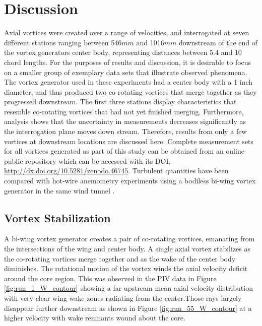 
\section{Discussion}

Axial vortices were created over a range of velocities, and interrogated at 
seven different stations ranging between 546$mm$ and 1016$mm$ downstream of the 
end of the vortex generators center body, representing distances between 5.4 
and 10 chord lengths. For the 
purposes of results and discussion, it is desirable to focus on a smaller group 
of exemplary data sets that illustrate observed phenomena. The vortex generator 
used in these experiments had a center body with a 1 inch diameter, and thus 
produced two co-rotating vortices that merge together as they progressed 
downstream. 
The first three stations display characteristics that resemble co-rotating 
vortices that had not yet finished merging. Furthermore, analysis shows that 
the uncertainty in measurements decreases significantly as the interrogation 
plane moves down stream. Therefore, results from only a few vortices at 
downstream locations are discussed here. Complete measurement sets for all 
vortices generated as part of this study can be obtained from an online public 
repository which can be accessed with its DOI,  
\url{http://dx.doi.org/10.5281/zenodo.46745}. Turbulent quantities have 
been compared with hot-wire anemometry experiments using a bodiless bi-wing 
vortex generator in the same wind tunnel \cite{thompson2016}.


\subsection{Vortex Stabilization}
A bi-wing vortex generator creates a pair of co-rotating vortices, emanating 
from the intersections of the wing and center body. A single 
axial vortex stabilizes as the co-rotating vortices merge together and as the 
wake of the center body diminishes. The rotational motion of the vortex 
winds the axial velocity deficit around the core region. This was observed 
in the PIV data in Figure \ref{fig:run_1_W_contour} showing a far upstream 
mean axial velocity distribution with very clear wing wake zones radiating from 
the center.Those rays largely disappear further downstream as shown in Figure 
\ref{fig:run_55_W_contour} at a higher velocity with wake remnants wound about 
the core. 

\vspace{32pt}



